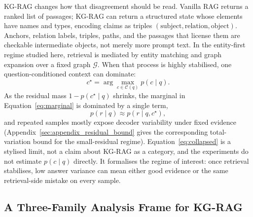KG-RAG changes how that disagreement should be read.
Vanilla RAG returns a ranked list of passages; KG-RAG can return a structured
state whose elements have names and types, encoding claims as triples
$(\mathrm{subject}, \mathrm{relation}, \mathrm{object})$.
Anchors, relation labels, triples, paths, and the passages that license them
are checkable intermediate objects, not merely more prompt text.
In the entity-first regime studied here, retrieval is mediated by entity
matching and graph expansion over a fixed graph $\mathcal{G}$.
When that process is highly stabilised, one question-conditioned context can
dominate:
\begin{equation}
  c^\star = \arg\max_{c \in \mathcal{C}(q)} p(c \mid q).
\end{equation}
As the residual mass $1 - p(c^\star \mid q)$ shrinks, the marginal in
Equation~\eqref{eq:marginal} is dominated by a single term,
\begin{equation}
  p(r \mid q) \approx p(r \mid q, c^\star),
  \label{eq:collapsed}
\end{equation}
and repeated samples mostly expose decoder variability under fixed evidence
(Appendix~\ref{sec:appendix_residual_bound} gives the corresponding
total-variation bound for the small-residual regime).
Equation~\eqref{eq:collapsed} is a stylised limit, not a claim about KG-RAG
as a category, and the experiments do not estimate $p(c \mid q)$ directly.
It formalises the regime of interest: once retrieval stabilises, low answer
variance can mean either good evidence or the same retrieval-side mistake on
every sample.

\subsection{A Three-Family Analysis Frame for KG-RAG}
\label{sec:decomposition}



